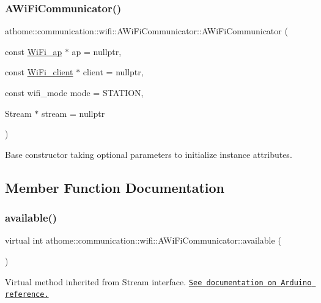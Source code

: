 \subsubsection{\texorpdfstring{A\+Wi\+Fi\+Communicator()}{AWiFiCommunicator()}}
{\footnotesize\ttfamily athome\+::communication\+::wifi\+::\+A\+Wi\+Fi\+Communicator\+::\+A\+Wi\+Fi\+Communicator (\begin{DoxyParamCaption}\item[{const \mbox{\hyperlink{structathome_1_1communication_1_1wifi_1_1s__wifi__access__point}{Wi\+Fi\+\_\+ap}} $\ast$}]{ap = {\ttfamily nullptr},  }\item[{const \mbox{\hyperlink{structathome_1_1communication_1_1wifi_1_1s__wifi__client}{Wi\+Fi\+\_\+client}} $\ast$}]{client = {\ttfamily nullptr},  }\item[{const wifi\+\_\+mode}]{mode = {\ttfamily STATION},  }\item[{Stream $\ast$}]{stream = {\ttfamily nullptr} }\end{DoxyParamCaption})}

Base constructor taking optional parameters to initialize instance attributes. 

\subsection{Member Function Documentation}
\mbox{\label{classathome_1_1communication_1_1wifi_1_1_a_wi_fi_communicator_ab71f3c62a890abdefe549d69b40b12ba}} 
\subsubsection{\texorpdfstring{available()}{available()}}
{\footnotesize\ttfamily virtual int athome\+::communication\+::wifi\+::\+A\+Wi\+Fi\+Communicator\+::available (\begin{DoxyParamCaption}{ }\end{DoxyParamCaption})\hspace{0.3cm}{\ttfamily [pure virtual]}}

Virtual method inherited from Stream interface. \href{https://www.arduino.cc/reference/en/language/functions/communication/stream/streamavailable/}{\tt See documentation on Arduino reference.} 

